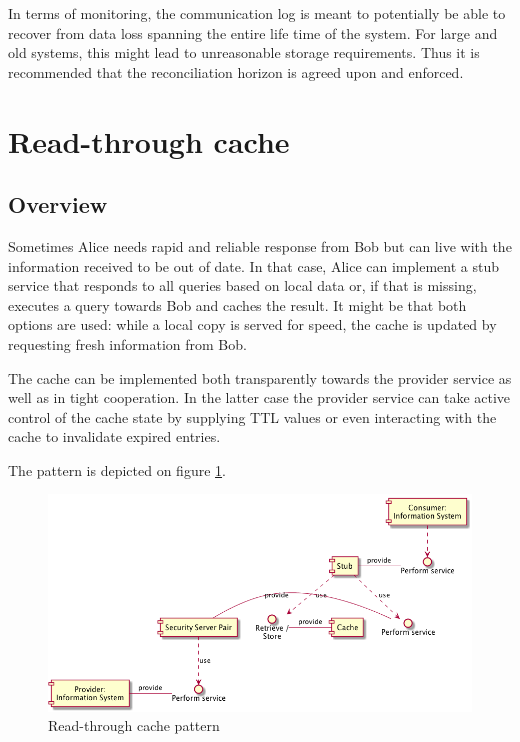 \documentclass[10pt,a4paper]{article}
\begin{document}
In terms of monitoring, the communication log is meant to potentially be able to recover from data loss spanning the entire life time of the system. For large and old systems, this might lead to unreasonable storage requirements. Thus it is recommended that the reconciliation horizon is agreed upon and enforced. 


\section{Read-through cache}
\label{sec:p:13}
\subsection{Overview}

Sometimes Alice needs rapid and reliable response from Bob but can live with the information received to be out of date. In that case, Alice can implement a stub service that responds to all queries based on local data or, if that is missing, executes a query towards Bob and caches the result. It might be that both options are used: while a local copy is served for speed, the cache is updated by requesting fresh information from Bob. 

The cache can be implemented both transparently towards the provider service as well as in tight cooperation. In the latter case the provider service can take active control of the cache state by supplying TTL values or even interacting with the cache to invalidate expired entries. 

The pattern is depicted on figure \ref{fig:p:13}.

\begin{figure}[htp]
	\begin{center}
		\includegraphics[width=1\textwidth]{gfx/13_comp.png}
		\caption{Read-through cache pattern}
		\label{fig:p:13}
	\end{center}
\end{figure}
\end{document}
